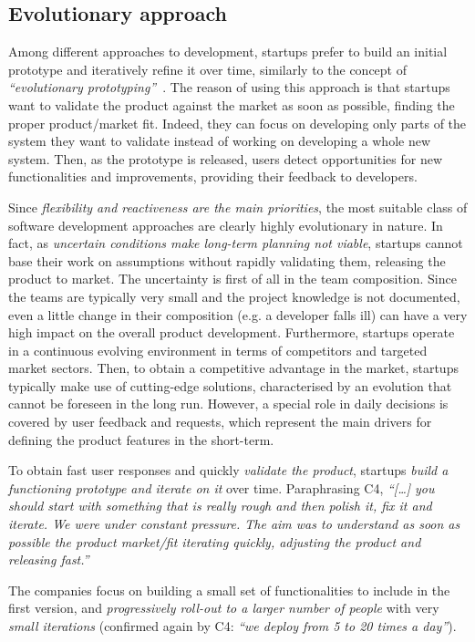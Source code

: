 \documentclass[10pt,journal,letterpaper,compsoc]{IEEEtran}
\begin{document}
\subsection{Evolutionary approach}\label{res:gsm:cat2} 
Among different approaches to development, startups prefer to build an initial 
prototype and iteratively refine it over time, similarly to the concept of
\textit{``evolutionary prototyping''}~\cite{EvProt}. The reason of using this
approach is that startups want to validate the product against the market as
soon as possible, finding the proper product/market fit. Indeed, they can focus
on developing only parts of the system they want to validate instead of working
on developing a whole new system. Then, as the prototype is released, users
detect opportunities for new functionalities and improvements, providing their
feedback to developers.


Since \textit{flexibility and reactiveness are the main priorities}, the most
suitable class of software development approaches are clearly highly
evolutionary in nature. In fact, as \textit{uncertain conditions make long-term
planning not viable}, startups cannot base their work on assumptions without
rapidly validating them, releasing the product to market. The uncertainty is
first of all in the team composition. Since the teams are typically very small
and the project knowledge is not documented, even a little change in their
composition (e.g. a developer falls ill) can have a very high impact on the
overall product development. Furthermore, startups operate in a continuous
evolving environment in terms of competitors and targeted market sectors. Then,
to obtain a competitive advantage in the market, startups typically make use of
cutting-edge solutions, characterised by an evolution that cannot be foreseen in
the long run. However, a special role in daily decisions is covered by user
feedback and requests, which represent the main drivers for defining the product
features in the short-term.

To obtain fast user responses and quickly \textit{validate the product},
startups \textit{build a functioning prototype and iterate on it} over time.
Paraphrasing C4, \textit{``[\ldots] you should start with something that is
really rough and then polish it, fix it and iterate. We were under constant
pressure. The aim was to understand as soon as possible the product market/fit
iterating quickly, adjusting the product and releasing fast.''}

The companies focus on building a small set of functionalities to include in
the first version, and \textit{progressively roll-out to a larger number of
people} with very \textit{small iterations} (confirmed again by C4: \textit{``we
deploy from 5 to 20 times a day''}).
\end{document}
